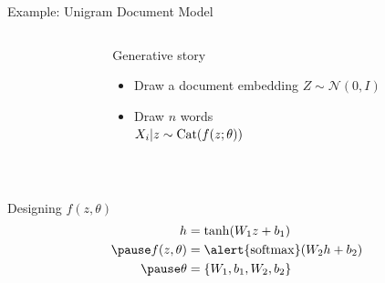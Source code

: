 \begin{frame}{Example: Unigram Document Model}


\begin{columns}
	\begin{column}{0.2\textwidth}
    \end{column}
    \begin{column}{0.75\textwidth}
    	Generative story 
    	\begin{itemize}
			\item Draw a document embedding $Z \sim \mathcal N(0, I)$
			\item Draw $n$ words\\
			$X_i|z \sim \operatorname{Cat}(f(z; \theta))$
		\end{itemize}
    \end{column}
    \end{columns}
    \pause
    
    ~
    
    Designing $f(z, \theta)$    \pause
    \begin{equation*}
	\begin{aligned}						
		h &= \tanh(W_1z+b_1) \\ \pause
		f(z, \theta) &= \alert{\softmax}(W_2h + b_2) \\		\pause
		\theta &= \{W_1, b_1, W_2, b_2\}
	\end{aligned}
	\end{equation*}
	

\end{frame}

